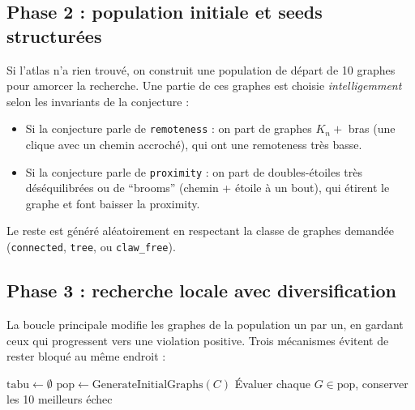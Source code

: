 \documentclass[12pt,a4paper]{article}
\begin{document}
\subsection{Phase 2 : population initiale et seeds structurées}

Si l'atlas n'a rien trouvé, on construit une population de départ de 10 graphes
pour amorcer la recherche.  Une partie de ces graphes est choisie \emph{intelligemment}
selon les invariants de la conjecture :

\begin{itemize}
  \item Si la conjecture parle de \texttt{remoteness} : on part de graphes
        $K_n +$ bras (une clique avec un chemin accroché), qui ont une remoteness
        très basse.
  \item Si la conjecture parle de \texttt{proximity} : on part de doubles-étoiles
        très déséquilibrées ou de ``brooms'' (chemin + étoile à un bout), qui
        étirent le graphe et font baisser la proximity.
\end{itemize}

Le reste est généré aléatoirement en respectant la classe de graphes demandée
(\texttt{connected}, \texttt{tree}, ou \texttt{claw\_free}).

\subsection{Phase 3 : recherche locale avec diversification}

La boucle principale modifie les graphes de la population un par un,
en gardant ceux qui progressent vers une violation positive.
Trois mécanismes évitent de rester bloqué au même endroit :

\begin{algorithm}[H]
\SetAlgoLined
{}
\BlankLine
$\text{tabu} \leftarrow \emptyset$\;
$\text{pop} \leftarrow \text{GenerateInitialGraphs}(C)$\;
Évaluer chaque $G \in \text{pop}$, conserver les 10 meilleurs\;
\BlankLine
{}
\Return échec\;
\caption{Recherche locale avec liste taboue, kick et redémarrage}
\end{algorithm}
\end{document}
